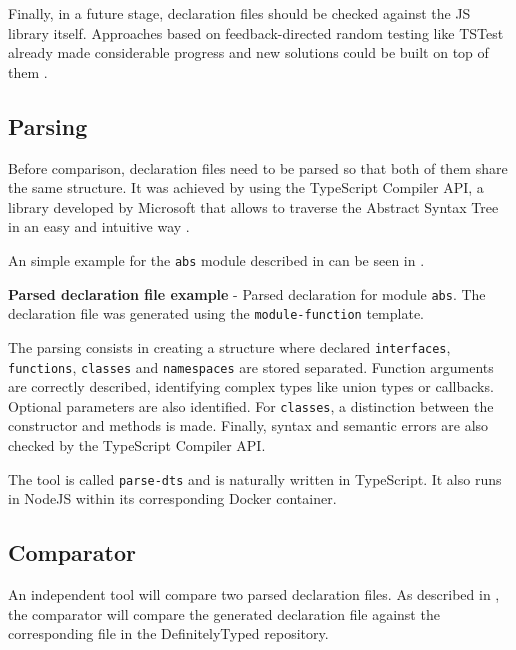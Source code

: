 Finally, in a future stage, declaration files should be checked against the JS library itself. Approaches based on feedback-directed random testing like TSTest already made considerable progress and new solutions could be built on top of them \citep{DBLP:journals/pacmpl/KristensenM17}.



\subsection{Parsing}
Before comparison, declaration files need to be parsed so that both of them share the same structure. It was achieved by using the TypeScript Compiler API, a library developed by Microsoft that allows to traverse the Abstract Syntax Tree in an easy and intuitive way \citep{ts-compiler-api}.

An simple example for the \texttt{abs} module described in  can be seen in . 

\begin{code}
  \captionsetup{aboveskip=0pt, belowskip=10pt}
  \caption[Parsed declaration file example]{\textbf{Parsed declaration file example} - Parsed declaration for module \texttt{abs}. The declaration file was generated using the \texttt{module-function} template.}
  \label{code:parsing-module-function}
\end{code}

The parsing consists in creating a structure where declared \texttt{interfaces}, \texttt{functions}, \texttt{classes} and \texttt{namespaces} are stored separated. Function arguments are correctly described, identifying complex types like union types or callbacks. Optional parameters are also identified. For \texttt{classes}, a distinction between the constructor and methods is made. Finally, syntax and semantic errors are also checked by the TypeScript Compiler API.

The tool is called \texttt{parse-dts} and is naturally written in TypeScript. It also runs in NodeJS within its corresponding Docker container.

\subsection{Comparator}
An independent tool will compare two parsed declaration files. As described in , the comparator will compare the generated declaration file against the corresponding file in the DefinitelyTyped repository.


